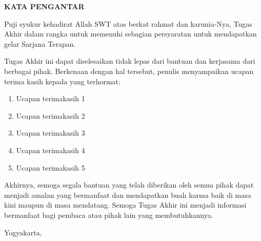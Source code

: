 \clearpage
{}
{}
\begin{center}
    \textbf{\large KATA PENGANTAR}\\[3em]
\end{center}

Puji syukur kehadirat Allah SWT atas berkat rahmat dan karunia-Nya, Tugas Akhir dalam rangka untuk memenuhi sebagian persyaratan untuk mendapatkan gelar Sarjana Terapan.

Tugas Akhir ini dapat diselesaikan tidak lepas dari bantuan dan kerjasama dari berbagai pihak. Berkenaan dengan hal tersebut, penulis menyampaikan ucapan terima kasih kepada yang terhormat:

\begin{enumerate}
    \item Ucapan terimakasih 1
    \item Ucapan terimakasih 2
    \item Ucapan terimakasih 3
    \item Ucapan terimakasih 4
    \item Ucapan terimakasih 5
\end{enumerate}

Akhirnya, semoga segala bantuan yang telah diberikan oleh semua pihak dapat menjadi amalan yang bermanfaat dan mendapatkan buah karma baik di masa kini maupun di masa mendatang. Semoga Tugas Akhir ini menjadi informasi bermanfaat bagi pembaca atau pihak lain yang membutuhkannya.

\begin{flushright}
    Yogyakarta, \tglpengesahan\\[1.25cm]
    \penulis \\
    \nim
\end{flushright}